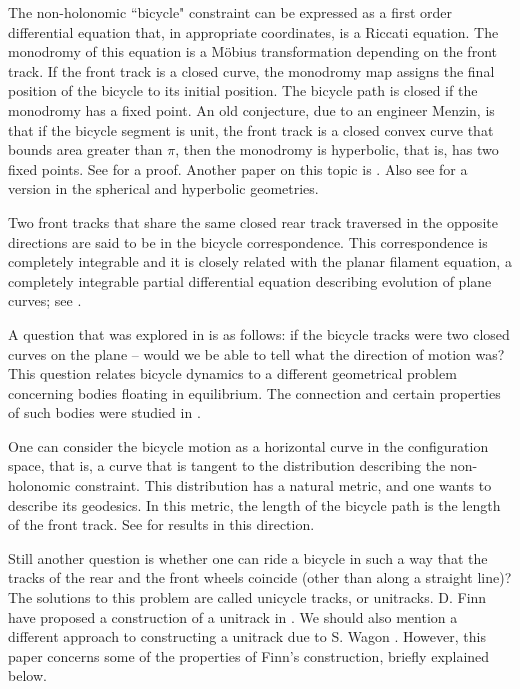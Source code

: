 \documentclass{article}
\theoremstyle{definition}
\begin{document}
The non-holonomic ``bicycle" constraint can be expressed as a first order differential equation that, in appropriate coordinates, is a Riccati equation. The monodromy of this equation is a M\"obius transformation depending on the front track. If the front track is a closed curve, the monodromy map assigns the final position of the bicycle to its initial position. The bicycle path is closed if the monodromy has a fixed point. An old conjecture, due to an engineer Menzin, is that if the bicycle segment is unit, the front track is a closed convex curve that bounds area greater than $\pi$, then the monodromy is hyperbolic, that is, has two fixed points. See \cite{LT} for a proof. Another paper on this topic is \cite{BHT}. Also see \cite{HPZ} for a version in the spherical and hyperbolic geometries. 

Two front tracks that share the same closed rear track traversed in the opposite directions are said to be in the bicycle correspondence. This correspondence is completely integrable and it is closely related with the planar filament equation, a completely integrable partial differential equation describing evolution of plane curves; see \cite{BLPT,Ta}. 

A question that was explored in \cite{Fi2} is as follows: if the bicycle tracks were two closed curves on the plane -- would we be able to tell what  the direction of motion was? This question relates bicycle dynamics to a different geometrical problem concerning bodies floating in equilibrium. The connection and certain properties of such bodies were studied in  \cite{We}.

One can consider the bicycle motion as a horizontal curve in the configuration space, that is, a curve that is tangent to the distribution describing the non-holonomic constraint. This distribution has a natural metric, and one wants to describe its geodesics. In this metric, the length of the bicycle path is the length of the front track. See \cite{ABLMS,BJT,PT} for results in this direction. 

Still another question is whether one can ride a bicycle in such a way that the tracks of the rear and the front wheels coincide (other than along a straight line)? The solutions to this problem are called unicycle tracks, or unitracks. D. Finn have proposed a construction of a unitrack in \cite{Fi1}. We should also mention a different approach to constructing a unitrack due to S. Wagon \cite{Wa}. However, this paper concerns some of the properties of Finn's construction, briefly explained below.
\end{document}
